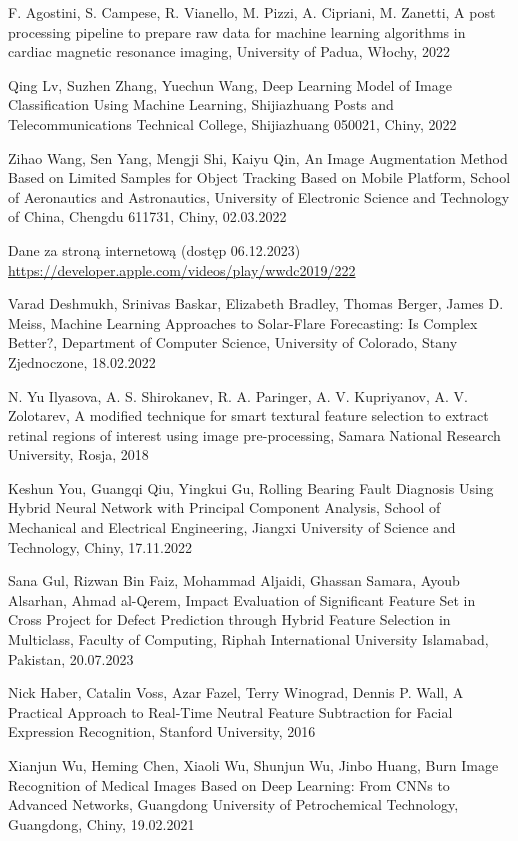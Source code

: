 \documentclass[12pt, a4paper, twoside, openany]{book}
\begin{document}
\begin{enumerate}[label={[}\arabic*{]}]
    \item F. Agostini, S. Campese, R. Vianello, M. Pizzi, A. Cipriani, M. Zanetti, A post processing pipeline to prepare raw data for machine learning algorithms in cardiac magnetic resonance imaging, University of Padua, Włochy, 2022
    \item Qing Lv, Suzhen Zhang, Yuechun Wang, Deep Learning Model of Image Classification Using Machine Learning, Shijiazhuang Posts and Telecommunications Technical College, Shijiazhuang 050021, Chiny, 2022
    \item Zihao Wang, Sen Yang, Mengji Shi, Kaiyu Qin, An Image Augmentation Method Based on Limited Samples for Object Tracking Based on Mobile Platform, School of Aeronautics and Astronautics, University of Electronic Science and Technology of China, Chengdu 611731, Chiny, 02.03.2022
    \item Dane za stroną internetową (dostęp 06.12.2023) \url{https://developer.apple.com/videos/play/wwdc2019/222}
    \item Varad Deshmukh, Srinivas Baskar, Elizabeth Bradley, Thomas Berger, James D. Meiss, Machine Learning Approaches to Solar-Flare Forecasting: Is Complex Better?, Department of Computer Science, University of Colorado, Stany Zjednoczone, 18.02.2022
    \item N. Yu Ilyasova, A. S. Shirokanev, R. A. Paringer, A. V. Kupriyanov, A. V. Zolotarev, A modified technique for smart textural feature selection to extract retinal regions of interest using image pre-processing, Samara National Research University, Rosja, 2018
    \item Keshun You, Guangqi Qiu, Yingkui Gu, Rolling Bearing Fault Diagnosis Using Hybrid Neural Network with Principal Component Analysis, School of Mechanical and Electrical Engineering, Jiangxi University of Science and Technology, Chiny, 17.11.2022
    \item Sana Gul, Rizwan Bin Faiz, Mohammad Aljaidi, Ghassan Samara, Ayoub Alsarhan, Ahmad al-Qerem, Impact Evaluation of Significant Feature Set in Cross Project for Defect Prediction through Hybrid Feature Selection in Multiclass, Faculty of Computing, Riphah International University Islamabad, Pakistan, 20.07.2023
    \item Nick Haber, Catalin Voss, Azar Fazel, Terry Winograd, Dennis P. Wall, A Practical Approach to Real-Time Neutral Feature Subtraction for Facial Expression Recognition, Stanford University, 2016
    \item Xianjun Wu, Heming Chen, Xiaoli Wu, Shunjun Wu, Jinbo Huang, Burn Image Recognition of Medical Images Based on Deep Learning: From CNNs to Advanced Networks, Guangdong University of Petrochemical Technology, Guangdong, Chiny, 19.02.2021

\end{enumerate}
\end{document}
